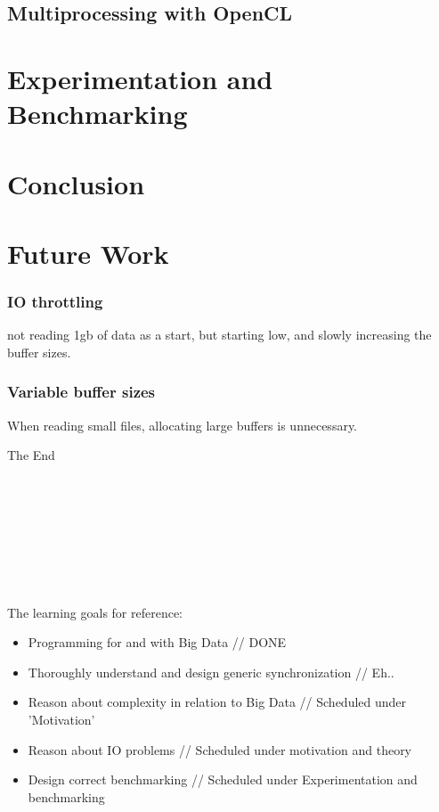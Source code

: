 \documentclass[a4paper]{article}
\begin{document}
\subsection{Multiprocessing with OpenCL}


\section{Experimentation and Benchmarking}


\section{Conclusion}


\section{Future Work}
\subsubsection{IO throttling}
not reading 1gb of data as a start, but starting low, and slowly increasing the buffer sizes.

\subsubsection{Variable buffer sizes}
When reading small files, allocating large buffers is unnecessary.






The End \\\\\\\\\\\\\\\\\\

The learning goals for reference:

\begin{itemize}
  \item Programming for and with Big Data  // DONE
  \item Thoroughly understand and design generic synchronization  // Eh..
  \item Reason about complexity in relation to Big Data // Scheduled under 'Motivation'
  \item Reason about IO problems  // Scheduled under motivation and theory
  \item Design correct benchmarking  // Scheduled under Experimentation and benchmarking
\end{itemize}
\end{document}

